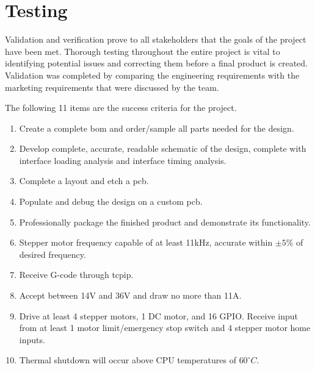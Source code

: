 \newcommand{\testheader}{\textrotate{\textbf{Step}} & \textbf{Action} & \textbf{Expected Result} & \textrotate{\textbf{Pass}} & \textrotate{\textbf{Fail}} & \textrotate{\textbf{N/A}} & \textbf{Comments} \\ \hline}
\newcommand{\testinfo}[2]{\multicolumn{2}{|r|}{\textbf{Test Case Name:}} & \multicolumn{5}{m{11cm}|}{#1} \\ \hline \multicolumn{2}{|r|}{\textbf{Description:}} & \multicolumn{5}{m{11cm}|}{#2} \\ \hline}
\newcommand{\testerinfo}{\multicolumn{2}{|r|}{\textbf{Name of Tester:}} & & \multicolumn{3}{l|}{\textbf{Date:}} & \\ \hline \multicolumn{2}{|r|}{\textbf{HW/SW Version:}} & & \multicolumn{3}{l|}{\textbf{Time:}} & \\ \hline}
\newcommand{\testsetup}[1]{\multicolumn{2}{|r|}{\textbf{Setup:}} & \multicolumn{5}{m{11cm}|}{#1} \\ \hline}
\newcommand{\testtabular}[3]{\begin{tabular}{|m{.25cm}|m{4cm}|m{5cm}|m{.25cm}|m{.25cm}|m{.25cm}|m{3cm}|}\hline\testinfo{#1}{#2}\testerinfo\testsetup{#3}\testheader}

\chapter{Testing}
Validation and verification prove to all stakeholders that the goals of the project have been met.
Thorough testing throughout the entire project is vital to identifying potential issues and correcting them before a final product is created. 
Validation was completed by comparing the engineering requirements with the marketing requirements that were discussed by the team. 

The following 11 items are the success criteria for the project. 
\begin{enumerate}
	\item Create a complete \gls{bom} and order/sample all parts needed for the design.
	\item Develop complete, accurate, readable schematic of the design, complete with interface loading analysis and interface timing analysis. 
	\item Complete a layout and etch a \gls{pcb}.
	\item Populate and debug the design on a custom \gls{pcb}.
	\item Professionally package the finished product and demonstrate its functionality.
	\item Stepper motor frequency capable of at least 11kHz, accurate within $\pm5\%$ of desired frequency.
	\item Receive G-code through \gls{tcpip}.
	\item Accept between 14V and 36V and draw no more than 11A.
	\item Drive at least 4 stepper motors, 1 DC motor, and 16 GPIO. Receive input from at least 1 motor limit/emergency stop switch and 4 stepper motor home inputs.
	\item Thermal shutdown will occur above CPU temperatures of $60^{\circ}C$.
\end{enumerate}
